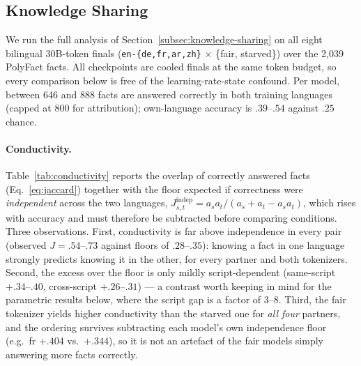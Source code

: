 \subsection{Knowledge Sharing}
\label{subsec:knowledge-sharing-results}

We run the full analysis of Section~\ref{subsec:knowledge-sharing} on all eight
bilingual 30B-token finals (\texttt{en-\{de,fr,ar,zh\}} $\times$
\{fair, starved\}) over the 2{,}039 PolyFact facts. All checkpoints are cooled
finals at the same token budget, so every comparison below is free of the
learning-rate-state confound. Per model, between 646 and 888 facts are answered
correctly in both training languages (capped at 800 for attribution);
own-language accuracy is $.39$--$.54$ against $.25$ chance.

\paragraph{Conductivity.}
Table~\ref{tab:conductivity} reports the overlap of correctly answered facts
(Eq.~\ref{eq:jaccard}) together with the floor expected if correctness were
\emph{independent} across the two languages,
$J^{\mathrm{indep}}_{s,t} = a_s a_t / (a_s + a_t - a_s a_t)$, which rises with
accuracy and must therefore be subtracted before comparing conditions. Three
observations. First, conductivity is far above independence in every pair
(observed $J = .54$--$.73$ against floors of $.28$--$.35$): knowing a fact in
one language strongly predicts knowing it in the other, for every partner and
both tokenizers. Second, the excess over the floor is only mildly
script-dependent (same-script $+.34$--$.40$, cross-script $+.26$--$.31$) --- a
contrast worth keeping in mind for the parametric results below, where the
script gap is a factor of $3$--$8$. Third, the fair tokenizer yields higher
conductivity than the starved one for \emph{all four} partners, and the
ordering survives subtracting each model's own independence floor (e.g.\ fr
$+.404$ vs.\ $+.344$), so it is not an artefact of the fair models simply
answering more facts correctly.

